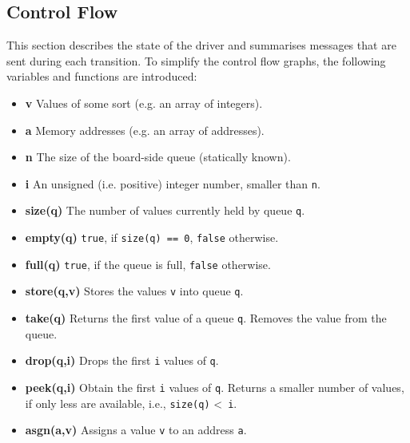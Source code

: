 \documentclass{report}
\begin{document}
\subsection{Control Flow}
\label{sec:protocol:cfg}

This section describes the state of the driver and summarises messages that are sent during each transition. To simplify the control flow graphs, the following variables and functions are introduced:

\begin{itemize} \itemsep1pt \parskip0pt 
  \item \textbf{v} Values of some sort (e.g. an array of integers).
  \item \textbf{a} Memory addresses (e.g. an array of addresses).
  \item \textbf{n} The size of the board-side queue (statically known).
  \item \textbf{i} An unsigned (i.e. positive) integer number, smaller than \texttt{n}.\\

  \item \textbf{size(q)} The number of values currently held by queue \texttt{q}.
  \item \textbf{empty(q)} \texttt{true}, if \texttt{size(q) == 0}, \texttt{false} otherwise.
  \item \textbf{full(q)} \texttt{true}, if the queue is full, \texttt{false} otherwise.
  \item \textbf{store(q,v)} Stores the values \texttt{v} into queue \texttt{q}.
  \item \textbf{take(q)} Returns the first value of a queue \texttt{q}. Removes the value from the queue.
  \item \textbf{drop(q,i)} Drops the first \texttt{i} values of \texttt{q}.
  \item \textbf{peek(q,i)} Obtain the first \texttt{i} values of \texttt{q}. Returns a smaller number of values, if only less are available, i.e., \texttt{size(q)} \textless ~\texttt{i}.
  \item \textbf{asgn(a,v)} Assigns a value \texttt{v} to an address  \texttt{a}.
\end{itemize}
\end{document}
